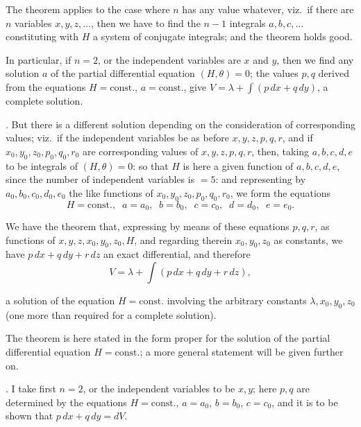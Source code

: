 \documentclass[11pt,a4paper]{article}
\begin{document}
The theorem applies to the case where $n$ has any value whatever, viz.\ if there are $n$ variables $x, y, z, \ldots$, then we have to find the $n - 1$ integrals $a, b, c, \ldots$ constituting with $H$ a system of conjugate integrals; and the theorem holds good.

In particular, if $n = 2$, or the independent variables are $x$ and $y$, then we find any solution $a$ of the partial differential equation $(H, \theta) = 0$; the values $p, q$ derived from the equations $H = \text{const.}$, $a = \text{const.}$, give $V = \lambda + \int (p\,dx + q\,dy)$, a complete solution.

\medskip

. But there is a different solution depending on the consideration of corresponding values; viz.\ if the independent variables be as before $x, y, z, p, q, r$, and if $x_{0}, y_{0}, z_{0}, p_{0}, q_{0}, r_{0}$ are corresponding values of $x, y, z, p, q, r$, then, taking $a, b, c, d, e$ to be integrals of $(H, \theta) = 0$: so that $H$ is here a given function of $a, b, c, d, e$, since the number of independent variables is $= 5$: and representing by $a_{0}, b_{0}, c_{0}, d_{0}, e_{0}$ the like functions of $x_{0}, y_{0}, z_{0}, p_{0}, q_{0}, r_{0}$, we form the equations
\[
H = \text{const.}, \;\; a = a_{0}, \;\; b = b_{0}, \;\; c = c_{0}, \;\; d = d_{0}, \;\; e = e_{0}.
\]

We have the theorem that, expressing by means of these equations $p, q, r$, as functions of $x, y, z, x_{0}, y_{0}, z_{0}, H$, and regarding therein $x_{0}, y_{0}, z_{0}$ as constants, we have $p\,dx + q\,dy + r\,dz$ an exact differential, and therefore
\[
V = \lambda + \int (p\,dx + q\,dy + r\,dz),
\]

\newpage


a solution of the equation $H = \text{const.}$ involving the arbitrary constants $\lambda, x_{0}, y_{0}, z_{0}$ (one more than required for a complete solution).

The theorem is here stated in the form proper for the solution of the partial differential equation $H = \text{const.}$; a more general statement will be given further on.

\medskip

. I take first $n = 2$, or the independent variables to be $x, y$; here $p, q$ are determined by the equations $H = \text{const.}$, $a = a_{0}$, $b = b_{0}$, $c = c_{0}$, and it is to be shown that $p\,dx + q\,dy = dV$.
\end{document}
